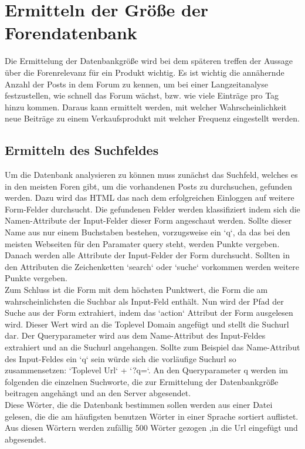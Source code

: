 \section{Ermitteln der Größe der Forendatenbank}
Die Ermittelung der Datenbankgröße wird bei dem späteren treffen der Aussage über die Forenrelevanz für ein Produkt wichtig.
Es ist wichtig die annähernde Anzahl der Posts in dem Forum zu kennen, um bei einer Langzeitanalyse festzustellen, wie schnell das Forum wächst, bzw. wie viele Einträge pro Tag hinzu kommen. Daraus kann ermittelt werden, mit welcher Wahrscheinlichkeit neue Beiträge zu einem Verkaufsprodukt mit welcher Frequenz eingestellt werden.\\
\subsection{Ermitteln des Suchfeldes}
Um die Datenbank analysieren zu können muss zunächst das Suchfeld, welches es in den meisten Foren gibt, um die vorhandenen Posts zu durchsuchen, gefunden werden.
Dazu wird das HTML das nach dem erfolgreichen Einloggen auf weitere Form-Felder durchsucht. Die gefundenen Felder werden klassifiziert indem sich die Namen-Attribute der Input-Felder dieser Form angeschaut werden. Sollte dieser Name aus nur einem Buchstaben bestehen, vorzugsweise ein `q`, da das bei den meisten Webseiten für den Paramater query steht, werden Punkte vergeben.
Danach werden alle Attribute der Input-Felder der Form durchsucht. Sollten in den Attributen die Zeichenketten `search` oder `suche` vorkommen werden weitere Punkte vergeben.\\
Zum Schluss ist die Form mit dem höchsten Punktwert, die Form die am wahrscheinlichsten die Suchbar als Input-Feld enthält.
Nun wird der Pfad der Suche aus der Form extrahiert, indem das `action` Attribut der Form ausgelesen wird. Dieser Wert wird an die Toplevel Domain angefügt und stellt die Suchurl dar. Der Queryparameter wird aus dem Name-Attribut des Input-Feldes extrahiert und an die Suchurl angehangen. Sollte zum Beispiel das Name-Attribut des Input-Feldes ein `q` sein würde sich die vorläufige Suchurl so zusammensetzen: `Toplevel Url` + `?q=`. An den Queryparameter q werden im folgenden die einzelnen Suchworte, die zur Ermittelung der Datenbankgröße beitragen angehängt und an den Server abgesendet.\\
Diese Wörter, die die Datenbank bestimmen sollen werden aus einer Datei gelesen, die die am häufigsten benutzen Wörter in einer Sprache sortiert auflistet. Aus diesen Wörtern werden zufällig 500 Wörter gezogen ,in die Url eingefügt und abgesendet.\\
